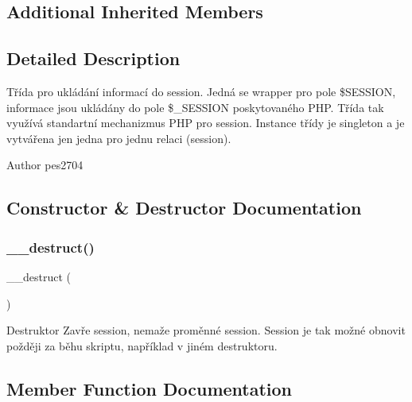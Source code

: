 \subsection*{Additional Inherited Members}


\subsection{Detailed Description}
Třída pro ukládání informací do session. Jedná se wrapper pro pole \$\+S\+E\+S\+S\+I\+ON, informace jsou ukládány do pole \$\+\_\+\+S\+E\+S\+S\+I\+ON poskytovaného P\+HP. Třída tak využívá standartní mechanizmus P\+HP pro session. Instance třídy je singleton a je vytvářena jen jedna pro jednu relaci (session).

\begin{DoxyAuthor}{Author}
pes2704 
\end{DoxyAuthor}


\subsection{Constructor \& Destructor Documentation}
\mbox{\label{class_pes_1_1_storage_1_1_session_storage_a421831a265621325e1fdd19aace0c758}} 
\subsubsection{\texorpdfstring{\+\_\+\+\_\+destruct()}{\_\_destruct()}}
{\footnotesize\ttfamily \+\_\+\+\_\+destruct (\begin{DoxyParamCaption}{ }\end{DoxyParamCaption})}

Destruktor Zavře session, nemaže proměnné session. Session je tak možné obnovit požději za běhu skriptu, například v jiném destruktoru. 

\subsection{Member Function Documentation}
\mbox{\label{class_pes_1_1_storage_1_1_session_storage_af5ea6a083ddb07beb8a30dd32e309ceb}} 
